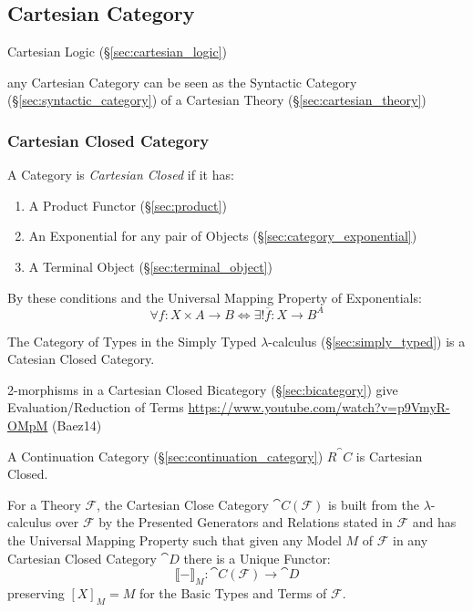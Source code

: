 \subsection{Cartesian Category}\label{sec:cartesian_category}

Cartesian Logic (\S\ref{sec:cartesian_logic})

any Cartesian Category can be seen as the Syntactic Category
(\S\ref{sec:syntactic_category}) of a Cartesian Theory
(\S\ref{sec:cartesian_theory})



\subsubsection{Cartesian Closed Category}\label{sec:cartesian_closed}

A Category is \emph{Cartesian Closed} if it has:
\begin{enumerate}
  \item A Product Functor (\S\ref{sec:product})
  \item An Exponential for any pair of Objects
    (\S\ref{sec:category_exponential})
  \item A Terminal Object (\S\ref{sec:terminal_object})
\end{enumerate}
By these conditions and the Universal Mapping Property of
Exponentials:
\[
  \forall f : X \times A \rightarrow B \Leftrightarrow
  \exists ! \overline{f} : X \rightarrow B^A
\]

The Category of Types in the Simply Typed $\lambda$-calculus
(\S\ref{sec:simply_typed}) is a Catesian Closed Category.

2-morphisms in a Cartesian Closed Bicategory (\S\ref{sec:bicategory})
give Evaluation/Reduction of Terms
\url{https://www.youtube.com/watch?v=p9VmyR-OMpM} (Baez14)

A Continuation Category (\S\ref{sec:continuation_category})
$R^\cat{C}$ is Cartesian Closed.

For a Theory $\mathcal{F}$, the Cartesian Close Category
$\cat{C}(\mathcal{F})$ is built from the $\lambda$-calculus over
$\mathcal{F}$ by the Presented Generators and Relations stated in
$\mathcal{F}$ and has the Universal Mapping Property such that given
any Model $M$ of $\mathcal{F}$ in any Cartesian Closed Category
$\cat{D}$ there is a Unique Functor:
\[
  \llbracket - \rrbracket_M :
    \cat{C}(\mathcal{F}) \rightarrow \cat{D}
\]
preserving $[X]_M = M$ for the Basic Types and Terms of $\mathcal{F}$.
\cite{awodey06}

